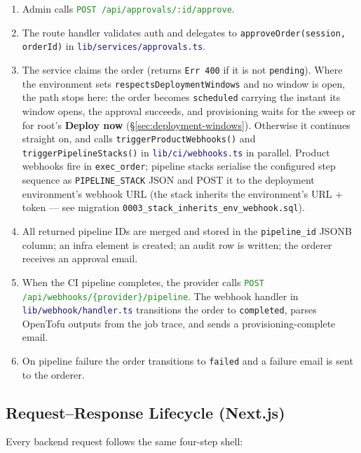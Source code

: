 \documentclass[12pt,a4paper,twoside]{report}
\newcommand{\code}[1]{\texttt{#1}}
\newcommand{\file}[1]{\texttt{\textcolor{MidnightBlue}{#1}}}
\newcommand{\route}[1]{\texttt{\textcolor{ForestGreen}{#1}}}
\newcommand{\menu}[1]{\textsf{\textbf{#1}}}
\begin{document}
\begin{enumerate}
  \item Admin calls \route{POST /api/approvals/:id/approve}.
  \item The route handler validates auth and delegates to
        \code{approveOrder(session, orderId)} in
        \file{lib/services/approvals.ts}.
  \item The service claims the order (returns \code{Err 400} if it is not
        \code{pending}). Where the environment sets
        \code{respectsDeploymentWindows} and no window is open, the path stops
        here: the order becomes \code{scheduled} carrying the instant its window
        opens, the approval succeeds, and provisioning waits for the sweep or for
        root's \menu{Deploy now} (\S\ref{sec:deployment-windows}). Otherwise it
        continues straight on, and calls \code{triggerProductWebhooks()} and
        \code{triggerPipelineStacks()} in \file{lib/ci/webhooks.ts} in
        parallel. Product webhooks fire in \code{exec\_order}; pipeline
        stacks serialise the configured step sequence as \code{PIPELINE\_STACK}
        JSON and POST it to the deployment environment's webhook URL (the
        stack inherits the environment's URL + token — see migration
        \code{0003\_stack\_inherits\_env\_webhook.sql}).
  \item All returned pipeline IDs are merged and stored in the
        \code{pipeline\_id} JSONB column; an infra element is created;
        an audit row is written; the orderer receives an approval email.
  \item When the CI pipeline completes, the provider calls
        \route{POST /api/webhooks/\{provider\}/pipeline}. The webhook
        handler in \file{lib/webhook/handler.ts} transitions the order to
        \code{completed}, parses OpenTofu outputs from the job trace, and
        sends a provisioning-complete email.
  \item On pipeline failure the order transitions to \code{failed} and a
        failure email is sent to the orderer.
\end{enumerate}

\subsection{Request–Response Lifecycle (Next.js)}

Every backend request follows the same four-step shell:
\end{document}
